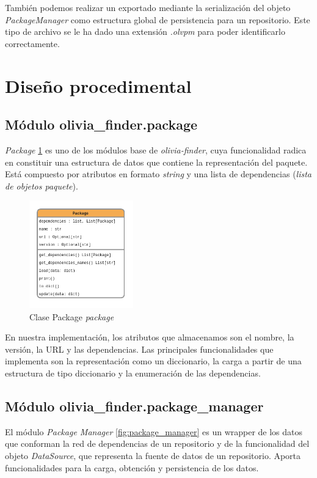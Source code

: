 También podemos realizar un exportado mediante la serialización del objeto \textit{PackageManager}
como estructura global de persistencia para un repositorio. Este tipo de archivo se le ha dado una
extensión \textit{.olvpm} para poder identificarlo correctamente.

\section{Diseño procedimental}

\subsection{Módulo olivia\_finder.package}

\textit{Package} \ref{fig:package} es uno de los módulos base de \textit{olivia-finder}, cuya funcionalidad radica en
constituir una estructura de datos que contiene la representación del paquete. Está compuesto por
atributos en formato \textit{string} y una lista de dependencias (\textit{lista de objetos paquete}).

\begin{figure}[ht!]
    \centering
    \includegraphics[width=0.4\textwidth]{img/anexos/package.png}
    \caption{Clase Package \textit{package}}
    \label{fig:package}
\end{figure}

En nuestra implementación, los atributos que almacenamos son el nombre, la versión, la URL y las
dependencias. Las principales funcionalidades que implementa son la representación como un
diccionario, la carga a partir de una estructura de tipo diccionario y la enumeración de las
dependencias.

\subsection{Módulo olivia\_finder.package\_manager}

El módulo \textit{Package Manager} \ref{fig:package_manager} es un wrapper de los datos que conforman la red de dependencias de
un repositorio y de la funcionalidad del objeto \textit{DataSource}, que representa la fuente de
datos de un repositorio. Aporta funcionalidades para la carga, obtención y persistencia de los datos.

